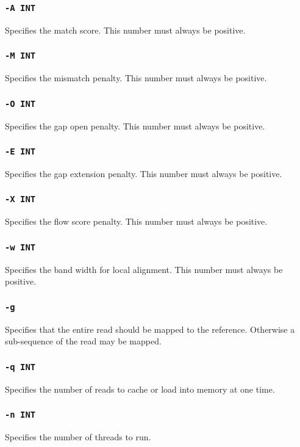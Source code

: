 \documentclass[a4paper,12pt]{book}
\newcommand{\TT}[1]{{\tt #1}} %
\begin{document}
\subsubsection{\TT{-A INT}}
Specifies the match score.
This number must always be positive.

\subsubsection{\TT{-M INT}}
Specifies the mismatch penalty.
This number must always be positive.

\subsubsection{\TT{-O INT}}
Specifies the gap open penalty.
This number must always be positive.

\subsubsection{\TT{-E INT}}
Specifies the gap extension penalty.
This number must always be positive.

\subsubsection{\TT{-X INT}}
Specifies the flow score penalty.
This number must always be positive.

\subsubsection{\TT{-w INT}}
Specifies the band width for local alignment.
This number must always be positive.

\subsubsection{\TT{-g}}
Specifies that the entire read should be mapped to the reference.
Otherwise a sub-sequence of the read may be mapped.
\subsubsection{\TT{-q INT}}
Specifies the number of reads to cache or load into memory at one time.

\subsubsection{\TT{-n INT}}
Specifies the number of threads to run.
\end{document}
